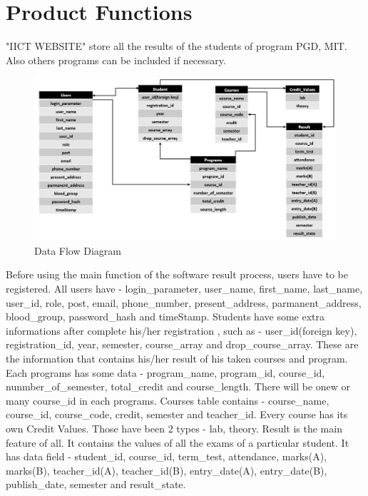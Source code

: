 \documentclass{scrreprt}
\begin{document}
\section{Product Functions}
"IICT WEBSITE" store all the results of the students of program PGD, MIT. Also others programs can be included if necessary.
\begin{figure}[h!]
    \centering
    \includegraphics[width=15cm]{3.JPG}
    \caption{Data Flow Diagram}
    \label{fig:Data Flow Diagram}
\end{figure}
Before using the main function of the software result process, users have to be registered. 
\newline
All users have - login\_parameter, user\_name, first\_name, last\_name, user\_id, role, post, email, phone\_number, present\_address, parmanent\_address, blood\_group, password\_hash and timeStamp.
\newline
Students have some extra informations after complete his/her registration , such as - user\_id(foreign key), registration\_id, year, semester, course\_array and drop\_course\_array. These are the information that contains his/her result of his taken courses and program.
\newline
Each programs has some data - program\_name, program\_id, course\_id, nunmber\_of\_semester, total\_credit and course\_length. There will be onew or many course\_id in each programs.
\newline
Courses table contains - course\_name, course\_id, course\_code, credit, semester and teacher\_id.
\newline
Every course has its own Credit Values. Those have been 2 types - lab, theory.
\newline
Result is the main feature of all. It contains the values of all the exams of a particular student. It has data field - student\_id, course\_id, term\_test, attendance, marks(A), marks(B), teacher\_id(A), teacher\_id(B), entry\_date(A), entry\_date(B), publish\_date, semester	and result\_state.
\end{document}
